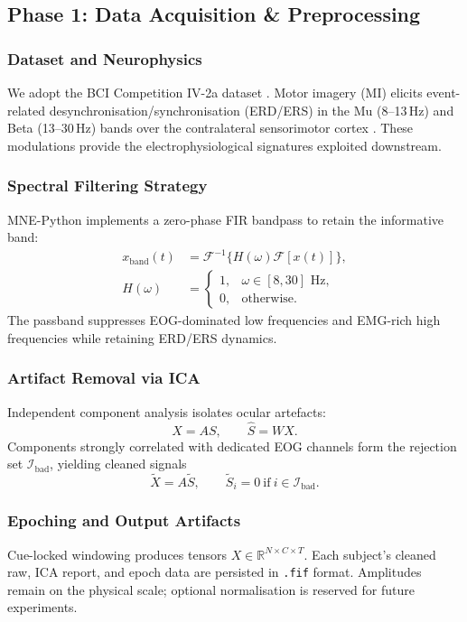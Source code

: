\documentclass[twocolumn]{article}
\begin{document}
\subsection{Phase 1: Data Acquisition \& Preprocessing}

\subsubsection{Dataset and Neurophysics}
We adopt the BCI Competition IV-2a dataset \cite{jeong2020multimodal}. Motor imagery (MI) elicits event-related desynchronisation/synchronisation (ERD/ERS) in the Mu (8--13\,Hz) and Beta (13--30\,Hz) bands over the contralateral sensorimotor cortex \cite{hameed2025enhancing}. These modulations provide the electrophysiological signatures exploited downstream.

\subsubsection{Spectral Filtering Strategy}
MNE-Python implements a zero-phase FIR bandpass to retain the informative band:
\begin{align}
    x_{\text{band}}(t) &= \mathcal{F}^{-1}\{H(\omega)\mathcal{F}[x(t)]\}, \\
    H(\omega) &=
    \begin{cases}
        1, & \omega\in[8,30]\text{ Hz},\\
        0, & \text{otherwise.}
    \end{cases}
\end{align}
The passband suppresses EOG-dominated low frequencies and EMG-rich high frequencies while retaining ERD/ERS dynamics.

\subsubsection{Artifact Removal via ICA}
Independent component analysis isolates ocular artefacts:
\begin{equation}
    X = AS,\qquad \hat{S}=WX.
\end{equation}
Components strongly correlated with dedicated EOG channels form the rejection set $\mathcal{I}_{\text{bad}}$, yielding cleaned signals
\begin{equation}
    \tilde{X}=A\tilde{S},\qquad \tilde{S}_{i}=0\ \text{if}\ i\in\mathcal{I}_{\text{bad}}.
\end{equation}

\subsubsection{Epoching and Output Artifacts}
Cue-locked windowing produces tensors $X\in\mathbb{R}^{N\times C\times T}$. Each subject’s cleaned raw, ICA report, and epoch data are persisted in \texttt{.fif} format. Amplitudes remain on the physical scale; optional normalisation is reserved for future experiments.
\end{document}
